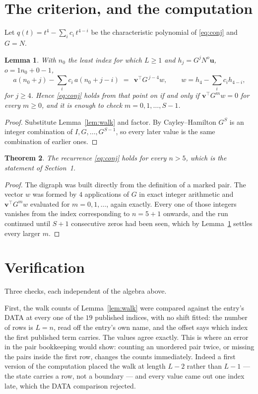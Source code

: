\documentclass[11pt,a4paper]{article}
\theoremstyle{plain}
\newtheorem{theorem}{Theorem}
\newtheorem{lemma}[theorem]{Lemma}
\theoremstyle{definition}
\begin{document}
\section{The criterion, and the computation}

Let $q(t)=t^{4}-\sum_i c_i\,t^{4-i}$ be the characteristic polynomial of
\eqref{eq:conj} and $G=N$.

\begin{lemma}\label{lem:crit}
With $n_0$ the least index for which $L\ge1$ and $h_j=G^{j}N^{o}\mathbf{u}$,
$o=1n_0+0-1$,
\[
a(n_0+j)-\sum_i c_i\,a(n_0+j-i)\;=\;\,\mathbf{v}^{\!\top}G^{\,j-4}w,
\qquad w=h_{4}-\sum_i c_i h_{4-i},
\]
for $j\ge4$. Hence \eqref{eq:conj} holds from that point on if and only if
$\mathbf{v}^{\!\top}G^{m}w=0$ for every $m\ge0$, and it is enough to check
$m=0,1,\dots,S-1$.
\end{lemma}

\begin{proof}
Substitute Lemma~\ref{lem:walk} and factor. By Cayley--Hamilton $G^{S}$ is an integer
combination of $I,G,\dots,G^{S-1}$, so every later value is the same combination of earlier
ones.
\end{proof}

\begin{theorem}
The recurrence \eqref{eq:conj} holds for every $n>5$, which is the statement of
Section~1.
\end{theorem}

\begin{proof}
The digraph was built directly from the definition of a marked pair. The vector $w$ was
formed by $4$ applications of $G$ in exact integer arithmetic and
$\mathbf{v}^{\!\top}G^{m}w$ evaluated for $m=0,1,\dots$, again exactly. Every one of
those integers vanishes from the index corresponding to $n=5+1$ onwards, and the run
continued until $S+1$ consecutive zeros had been seen, which by Lemma~\ref{lem:crit}
settles every larger $m$.
\end{proof}

\section{Verification}

Three checks, each independent of the algebra above.

First, the walk counts of Lemma~\ref{lem:walk} were compared against the entry's DATA at
every one of the $19$ published indices, with no shift fitted: the number of rows is
$L=n$, read off the entry's own name, and the offset says which index the first
published term carries. The values agree exactly. This is where an error in the pair
bookkeeping would show: counting an unordered pair twice, or missing the pairs inside the
first row, changes the counts immediately. Indeed a first version of the computation
placed the walk at length $L-2$ rather than $L-1$ --- the state carries a row, not a
boundary --- and every value came out one index late, which the DATA comparison rejected.
\end{document}
